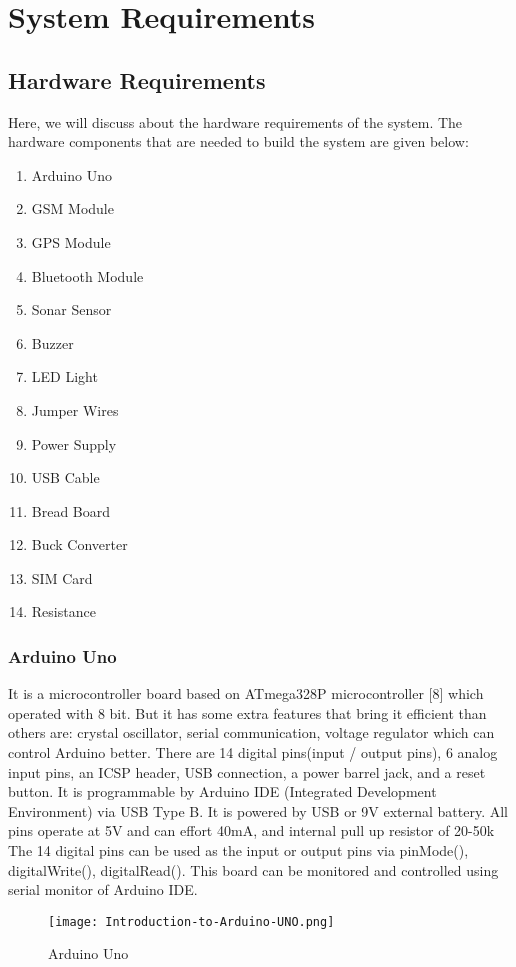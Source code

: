 \documentclass[12pt, top = 1 inch, bottom = 1 inch, left = 1.2 inch, top = .8 inch]{book}
\begin{document}
			\section{System Requirements}
			\newpage
			\subsection{Hardware Requirements}
			Here, we will discuss about the hardware requirements of the system. The hardware components that are needed to build the system are given below:
			\begin{enumerate}
				\item Arduino Uno
				\item GSM Module
				\item GPS Module
				\item Bluetooth Module
				\item Sonar Sensor 
				\item Buzzer
				\item LED Light
				\item Jumper Wires
				\item Power Supply
				\item USB Cable
				\item Bread Board
				\item Buck Converter
				\item SIM Card
				\item Resistance
			\end{enumerate}	
			\subsubsection{Arduino Uno}
			It is a microcontroller board based on ATmega328P microcontroller [8] which operated with 8 bit. But it has some extra features that bring it efficient than others are: crystal oscillator, serial communication, voltage regulator which can control Arduino better. There are 14 digital pins(input / output pins), 6 analog input pins, an ICSP header, USB connection, a power barrel jack, and a reset button. It is programmable by Arduino IDE (Integrated Development Environment) via USB Type B. It is powered by USB or 9V external battery. All pins operate at 5V and can effort 40mA, and internal pull up resistor of 20-50k The 14 digital pins can be used as the input or output pins via pinMode(), digitalWrite(), digitalRead(). This board can be monitored and controlled using serial monitor of Arduino IDE.
			\begin{figure}	
				\centering
				\texttt{[image: Introduction-to-Arduino-UNO.png]}
				\caption{Arduino Uno}
			\end{figure}
\end{document}
